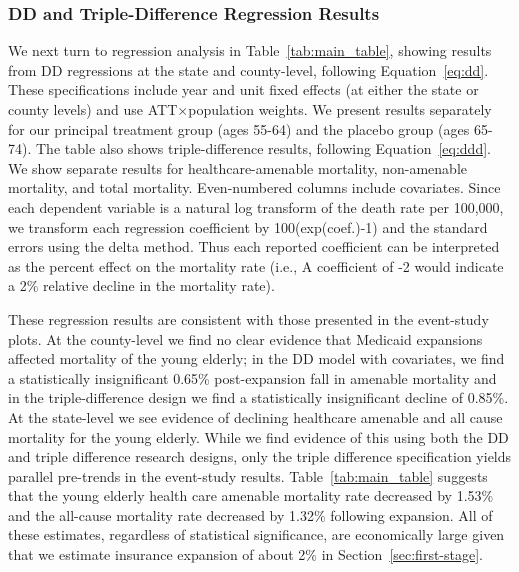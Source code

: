 \documentclass[12pt]{article}%
\begin{document}
\subsubsection{DD and Triple-Difference Regression Results}

We next turn to regression analysis in Table~\ref{tab:main_table}, showing results from DD regressions at the state and county-level, following Equation~\ref{eq:dd}. 
These specifications include year and unit fixed effects (at either the state or county levels) and use ATT$\times$population weights. 
We present results separately for our principal treatment group (ages 55-64) and the placebo group (ages 65-74). 
The table also shows triple-difference results, following Equation~\ref{eq:ddd}.  
We show separate results for healthcare-amenable mortality, non-amenable mortality, and total mortality.  
Even-numbered columns include covariates.  
Since each dependent variable is a natural log transform of the death rate per 100,000, we transform each regression coefficient by 100(exp(coef.)-1) and the standard errors using the delta method. 
Thus each reported coefficient can be interpreted as the percent effect on the mortality rate (i.e., A coefficient of -2 would indicate a 2\% relative decline in the mortality rate). 

These regression results are consistent with those presented in the event-study plots. 
At the county-level we find no clear evidence that Medicaid expansions affected mortality of the young elderly; in the DD model with covariates, we find a statistically insignificant 0.65\% post-expansion fall in amenable mortality and in the triple-difference design we find a statistically insignificant decline of 0.85\%. 
At the state-level we see evidence of declining healthcare amenable and all cause mortality for the young elderly. 
While we find evidence of this using both the DD and triple difference research designs, only the triple difference specification yields parallel pre-trends in the event-study results. 
Table~\ref{tab:main_table} suggests that the young elderly health care amenable mortality rate decreased by 1.53\% and the all-cause mortality rate decreased by 1.32\% following expansion. 
All of these estimates, regardless of statistical significance, are economically large given that we estimate insurance expansion of about 2\% in Section~\ref{sec:first-stage}. 
\end{document}
